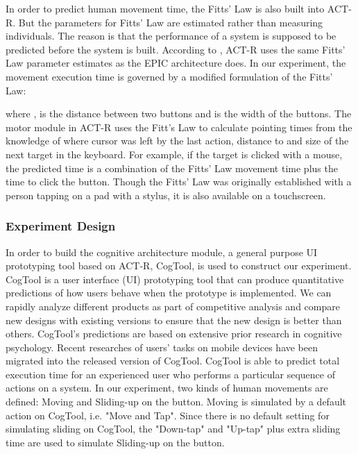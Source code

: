\documentclass{singlecol-new}
\theoremstyle{TH}{
\newtheorem{lemma}{Lemma}
\newtheorem{theorem}[lemma]{Theorem}
\newtheorem{corrolary}[lemma]{Corrolary}
\newtheorem{conjecture}[lemma]{Conjecture}
\newtheorem{proposition}[lemma]{Proposition}
\newtheorem{claim}[lemma]{Claim}
\newtheorem{stheorem}[lemma]{Wrong Theorem}
\newtheorem{algorithm}{Algorithm}
}
\theoremstyle{THrm}{
\newtheorem{definition}{Definition}[section]
\newtheorem{question}{Question}[section]
\newtheorem{remark}{Remark}
\newtheorem{scheme}{Scheme}
}
\theoremstyle{THhit}{
\newtheorem{case}{Case}[section]
}
\begin{document}
In order to predict human movement time, the Fitts' Law is also built into ACT-R. But the parameters for Fitts' Law are estimated rather than measuring individuals. The reason is that the performance of a system is supposed to be predicted before the system is built. According to \citet{byrne2001act}, ACT-R uses the same Fitts' Law parameter estimates as the EPIC architecture does. In our experiment, the movement execution time is governed by a modified formulation of the Fitts' Law:

where ,  is the distance between two buttons and  is the width of the buttons. The motor module in ACT-R uses the Fitt's Law to calculate pointing times from the knowledge of where cursor was left by the last action, distance to and size of the next target in the keyboard. For example, if the target is clicked with a mouse, the predicted time is a combination of the Fitts' Law movement time plus the time to click the button. Though the Fitts' Law was originally established with a person tapping on a pad with a stylus, it is also available on a touchscreen. \\

\subsubsection{Experiment Design}

In order to build the cognitive architecture module, a general purpose UI prototyping tool based on ACT-R, CogTool, is used to construct our experiment. CogTool is a user interface (UI) prototyping tool that can produce quantitative predictions of how users behave when the prototype is implemented. We can rapidly analyze different products as part of competitive analysis and compare new designs with existing versions to ensure that the new design is better than others. CogTool's predictions are based on extensive prior research in cognitive psychology. Recent researches of users' tasks on mobile devices have been migrated into the released version of CogTool. CogTool is able to predict total execution time for an experienced user who performs a particular sequence of actions on a system. In our experiment, two kinds of human movements are defined: Moving and Sliding-up on the button. Moving is simulated by a default action on CogTool, i.e. "Move and Tap". Since there is no default setting for simulating sliding on CogTool, the "Down-tap" and "Up-tap" plus extra sliding time are used to simulate Sliding-up on the button. \\
\end{document}
